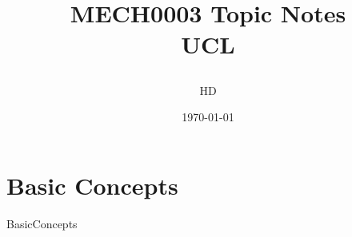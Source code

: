 \documentclass[12pt,a4paper, twoside]{report}
\begin{document}
\title{
  {MECH0003 Topic Notes}\\
  {\large UCL}
  \author{HD}
  \date{\today}
}
\maketitle

\tableofcontents
\chapter{Basic Concepts}
{BasicConcepts}
\end{document}
